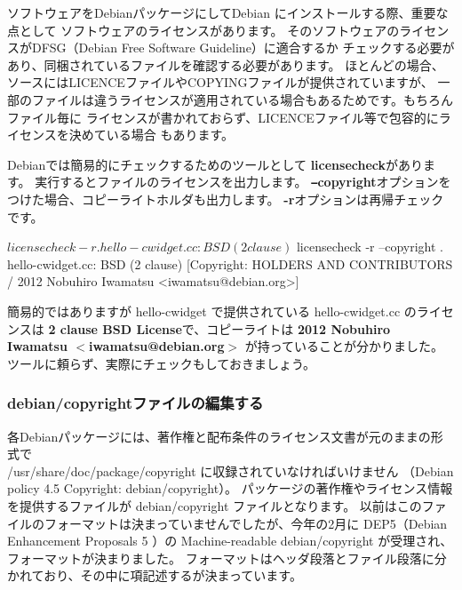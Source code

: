 \documentclass[mingoth,a4paper]{jsarticle}
\begin{document}
ソフトウェアをDebianパッケージにしてDebian にインストールする際、重要な点として
ソフトウェアのライセンスがあります。
そのソフトウェアのライセンスがDFSG（Debian Free Software Guideline）に適合するか
チェックする必要があり、同梱されているファイルを確認する必要があります。
ほとんどの場合、ソースにはLICENCEファイルやCOPYINGファイルが提供されていますが、
一部のファイルは違うライセンスが適用されている場合もあるためです。もちろんファイル毎に
ライセンスが書かれておらず、LICENCEファイル等で包容的にライセンスを決めている場合
もあります。

Debianでは簡易的にチェックするためのツールとして {\bf licensecheck}があります。
実行するとファイルのライセンスを出力します。
{\bf \texttt{--}copyright}オプションをつけた場合、コピーライトホルダも出力します。
{\bf -r}オプションは再帰チェックです。

\begin{commandline}
$ licensecheck -r .
hello-cwidget.cc: BSD (2 clause) 
$ licensecheck -r --copyright .
hello-cwidget.cc: BSD (2 clause) 
  [Copyright: HOLDERS AND CONTRIBUTORS / 2012 Nobuhiro Iwamatsu <iwamatsu@debian.org>]
\end{commandline}

簡易的ではありますが hello-cwidget で提供されている hello-cwidget.cc
のライセンスは {\bf 2 clause BSD License}で、コピーライトは {\bf 2012 Nobuhiro Iwamatsu $<$iwamatsu@debian.org$>$}
が持っていることが分かりました。
ツールに頼らず、実際にチェックもしておきましょう。

\subsubsection{debian/copyrightファイルの編集する}

各Debianパッケージには、著作権と配布条件のライセンス文書が元のままの形式で \\
/usr/share/doc/package/copyright に収録されていなければいけません
（Debian policy 4.5 Copyright: debian/copyright）。
パッケージの著作権やライセンス情報を提供するファイルが debian/copyright ファイルとなります。
以前はこのファイルのフォーマットは決まっていませんでしたが、今年の2月に
DEP5（Debian Enhancement Proposals 5 ）の Machine-readable debian/copyright
が受理され、フォーマットが決まりました。
フォーマットはヘッダ段落とファイル段落に分かれており、その中に項記述するが決まっています。
\end{document}
